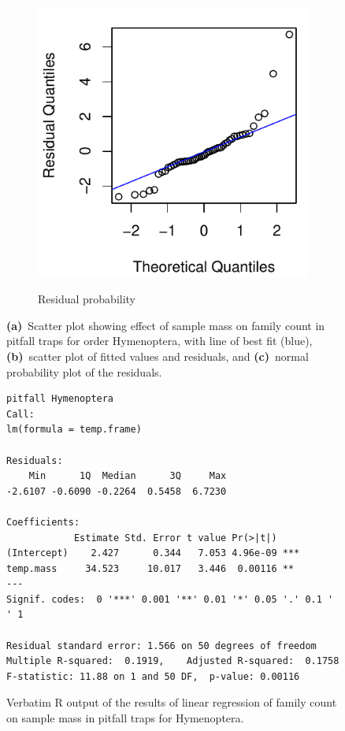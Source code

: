 \documentclass[10pt,letterpaper,twocolumn]{article}
\begin{document}
\begin{figure}[h]
\begin{subfigure}[b]{0.15\textwidth}
		\label{fig:pitfall_hymenoptera_resid}
	\end{subfigure}
	~
	\begin{subfigure}[b]{0.15\textwidth}
		\caption{Residual probability}
		\includegraphics[width=\textwidth]{plots/mass-vs-count/qqplot/2015_pitfall_Hymenoptera_qqplot.pdf}
		\label{fig:pitfall_hymenoptera_qqplot}
	\end{subfigure}
	\caption{\textbf{(a)}~Scatter plot showing effect of sample mass on family count in pitfall traps for order Hymenoptera, with line of best fit (blue), \textbf{(b)}~scatter plot of fitted values and residuals, and \textbf{(c)}~normal probability plot of the residuals.}
	\label{fig:pitfall_hymenoptera}
	\smallskip
	\nointerlineskip
	\hrulefill
\end{figure}

\begin{figure}[h]
	\lstset{numbers=left}
	\lstset{xleftmargin=5mm,framexleftmargin=5mm}
	\begin{lstlisting}
pitfall Hymenoptera
Call:
lm(formula = temp.frame)

Residuals:
    Min      1Q  Median      3Q     Max 
-2.6107 -0.6090 -0.2264  0.5458  6.7230 

Coefficients:
            Estimate Std. Error t value Pr(>|t|)    
(Intercept)    2.427      0.344   7.053 4.96e-09 ***
temp.mass     34.523     10.017   3.446  0.00116 ** 
---
Signif. codes:  0 '***' 0.001 '**' 0.01 '*' 0.05 '.' 0.1 ' ' 1

Residual standard error: 1.566 on 50 degrees of freedom
Multiple R-squared:  0.1919,	Adjusted R-squared:  0.1758 
F-statistic: 11.88 on 1 and 50 DF,  p-value: 0.00116
	\end{lstlisting}
	\caption{Verbatim R output of the results of linear regression of family count on sample mass in pitfall traps for Hymenoptera.}
	\label{fig:pitfall_hymenoptera_regression}
	\smallskip
	\nointerlineskip
	\hrulefill
\end{figure}
\end{document}
